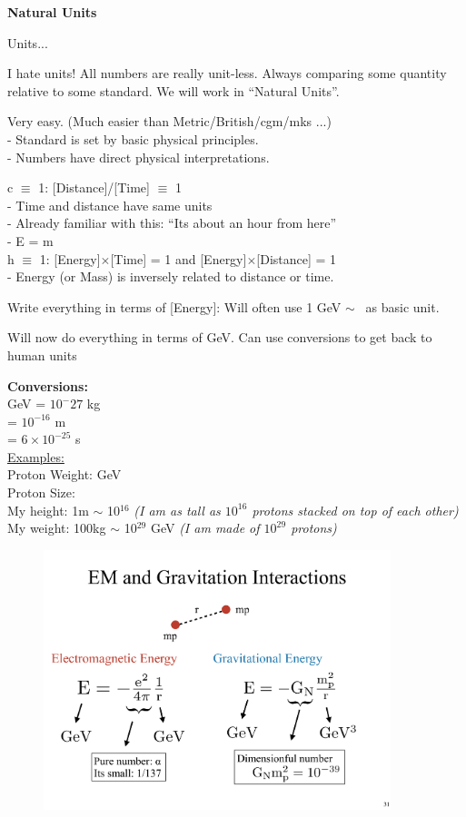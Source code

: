 \textbf{Natural Units}

Units...

I hate units! All numbers are really unit-less.
Always comparing some quantity relative to some standard. 
We will work in “Natural Units”.

Very easy. (Much easier than Metric/British/cgm/mks ...) \\
- Standard is set by basic physical principles.\\
- Numbers have direct physical interpretations.

c $\equiv$ 1: [Distance]/[Time] $\equiv$ 1\\
- Time and distance have same units\\
- Already familiar with this: ``Its about an hour from here''\\
- E = m\\

h $\equiv$ 1: [Energy]$\times$[Time] = 1 and [Energy]$\times$[Distance] = 1\\
- Energy (or Mass) is inversely related to distance or time.

Write everything in terms of [Energy]: Will often use 1 GeV $\sim$ \mp\ as basic unit.

Will now do everything in terms of GeV. 
Can use conversions to get back to human units

\textbf{Conversions:}\\
GeV = $10^-27 $ kg\\
\iGeV = $10^{-16}$ m\\
\iGeV = $6 \times 10^{-25}$ s\\

\underline{Examples:}\\
Proton Weight:  GeV \\
Proton Size:    \iGeV \\
My height: 1m $\sim$ 10$^{16}$ \iGeV \textit{(I am as tall as $10^{16}$ protons stacked on top of each other)}\\
My weight: 100kg $\sim$ 10$^{29}$ GeV \textit{(I am made of $10^{29}$ protons)}


\begin{figure}[h]
\centering
\includegraphics[width=0.9\textwidth]{./EMandGravity.pdf}
\end{figure}

